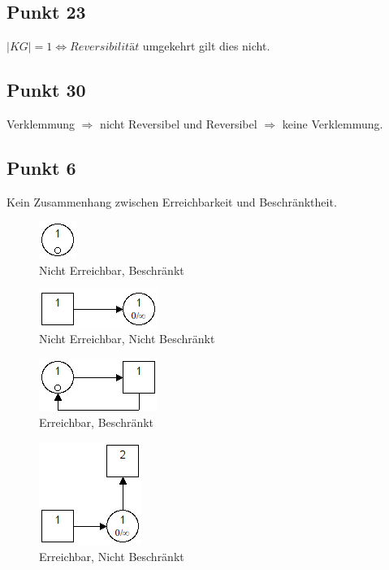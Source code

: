 \documentclass[10pt]{scrartcl}
\begin{document}
				\subsection{Punkt 23}
				$|KG| = 1 \Longleftrightarrow \textit{Reversibilität}$ umgekehrt gilt dies nicht.
				
				
				\subsection{Punkt 30}
				Verklemmung $\Longrightarrow$ nicht Reversibel und Reversibel $\Longrightarrow$ keine Verklemmung.	
			
				\subsection{Punkt 6}
				Kein Zusammenhang zwischen Erreichbarkeit und Beschränktheit.
				\begin{figure}[H]
    				\centering	
					\includegraphics[scale=0.5]{aufg061.png}		
            		\caption{Nicht Erreichbar, Beschränkt}
				\end{figure}
				\begin{figure}[H]
    				\centering	
					\includegraphics[scale=0.5]{aufg062.png}		
            		\caption{Nicht Erreichbar, Nicht Beschränkt}
				\end{figure}
				\begin{figure}[H]
    				\centering	
					\includegraphics[scale=0.5]{aufg063.png}		
            		\caption{Erreichbar, Beschränkt}
				\end{figure}
				\begin{figure}[H]
    				\centering	
					\includegraphics[scale=0.5]{aufg064.png}		
            		\caption{Erreichbar, Nicht Beschränkt}
				\end{figure}		
				
\end{document}
